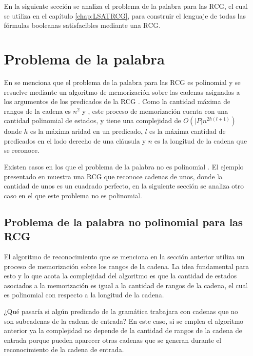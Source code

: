 \documentclass[12pt]{article}
\begin{document}
En la siguiente sección se analiza el problema de la palabra para las RCG, el cual se utiliza en el
capítulo \ref{chap:LSATRCG}, para construir el lenguaje de todas las fórmulas booleanas satisfacibles mediante
una RCG.

\section{Problema de la palabra}

En \cite{mainRCGBib} se menciona que el problema de la palabra para las RCG es polinomial y 
se resuelve mediante un algoritmo de memorización sobre las cadenas asignadas a los argumentos 
de los predicados de la RCG \cite{mainRCGBib}.  Como la cantidad máxima de rangos de la cadena es 
$n^2$ y , 
este proceso de memorización cuenta con una cantidad polinomial de estados, y 
tiene una complejidad de $O(|P|n^{2h(l+1)})$ donde $h$ es la máxima aridad en un predicado, $l$ es 
la máxima cantidad de predicados en el lado derecho de una cláusula y $n$ es la longitud de la cadena que se reconoce.

Existen casos en los que el problema de la palabra no es polinomial \cite{propertiesRCGBib}.  El ejemplo presentado en \cite{propertiesRCGBib} muestra una RCG que reconoce cadenas de unos, donde la cantidad de unos es un cuadrado perfecto, en la siguiente sección se analiza otro caso en el que este problema no es polinomial.

\subsection{Problema de la palabra no polinomial para las RCG}

El algoritmo de reconocimiento que se menciona en la sección anterior utiliza un proceso de memorización sobre los rangos de la cadena.  La idea fundamental para esto y lo que acota la complejidad del algoritmo es que la cantidad de estados asociados a la memorización es igual a la cantidad de rangos de la cadena, el cual es polinomial con respecto a la longitud de la cadena.

¿Qué pasaría si algún predicado de la gramática trabajara con cadenas que no son subcadenas de la cadena de entrada? 
En este caso, si se emplea el algoritmo anterior ya la complejidad no depende de la cantidad de rangos de la cadena de entrada 
porque pueden aparecer otras cadenas que se generan durante el reconocimiento de la cadena de entrada.
\end{document}
